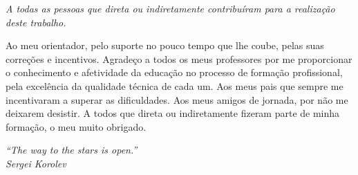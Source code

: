 \begin{folhadeaprovacao}
	\begin{center}
		\vspace*{0.5cm}
		{\large\imprimirlocal}
		\par
		{\large\imprimirdata}
		\vspace*{1cm}
	\end{center}

\end{folhadeaprovacao}

\begin{dedicatoria}
	\vspace*{\fill}
	\centering
	\noindent
	\textit{A todas as pessoas que direta ou indiretamente contribuíram para a realização deste trabalho.} \vspace*{\fill}
\end{dedicatoria}

\begin{agradecimentos}
	Ao meu orientador, pelo suporte no pouco tempo que lhe coube, pelas suas correções e incentivos.
	Agradeço a todos os  meus professores por me proporcionar o conhecimento e afetividade da educação 
	no processo de formação profissional, pela excelência da qualidade técnica de cada um.
	Aos meus pais que sempre me incentivaram a superar as dificuldades.
	Aos meus amigos de jornada, por não me deixarem desistir.
	A todos que direta ou indiretamente fizeram parte de minha formação, o meu muito obrigado.


\end{agradecimentos}

\begin{epigrafe}
	\vspace*{\fill}
	\begin{flushright}
		\textit{``The way to the stars is open.''\\
			Sergei Korolev}
	\end{flushright}
\end{epigrafe}


